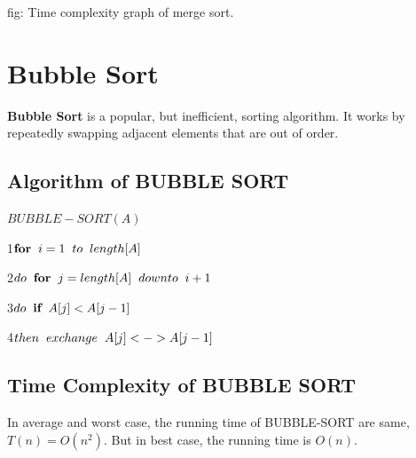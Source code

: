 \documentclass[9 pt]{report}
\begin{document}
\hspace{5cm}fig: Time complexity  graph  of merge sort.

\section{\huge Bubble Sort}



\textbf{Bubble Sort} is a popular, but inefficient, sorting algorithm. It works by repeatedly swapping adjacent elements that are out of order.

\subsection{\huge Algorithm of BUBBLE SORT}

\vspace{1cm}

$BUBBLE-SORT(A)$

1\hspace{0.5cm}$\textbf{for}\hspace{0.2cm}i=1\hspace{0.2cm}to\hspace{0.2cm}length[A]$

2\hspace{1cm}$do\hspace{0.2cm}\textbf{for}\hspace{0.2cm}j=length[A]\hspace{0.2cm}downto\hspace{0.2cm}i+1$

3\hspace{1.5cm}$do\hspace{0.2cm}\textbf{if}\hspace{0.2cm}A[j]<A[j-1]$

4\hspace{2cm}$then\hspace{0.2cm}exchange\hspace{0.2cm}A[j]<->A[j-1]$

\subsection{\huge Time Complexity of BUBBLE SORT}

 In  average and worst case, the running time of BUBBLE-SORT are same, $T(n)=O(n^2)$. But in best case, the running time is $O(n)$.

\vspace{1cm}
\end{document}
